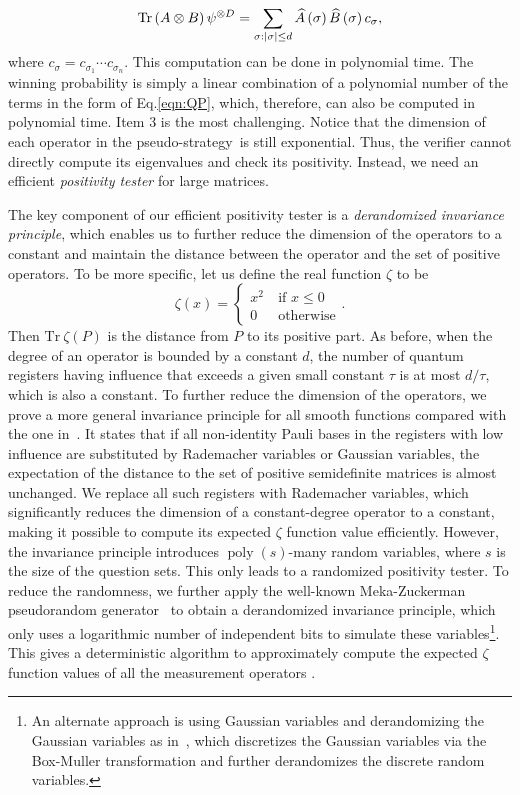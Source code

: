 \documentclass[11pt]{article}
\theoremstyle{plain}
\theoremstyle{definition}
\newcommand {\br} [1] {\ensuremath{ \left( #1 \right) }}
\DeclarePairedDelimiter{\abs}{\lvert}{\rvert}
\newcommand {\Tr} {\ensuremath{ \mathrm{Tr} }}
\newcommand{\poly} {\ensuremath{\operatorname{poly}}}
\newcommand{\pseudostrategy} {pseudo-strategy}
\newcommand{\1}{\mathbb{1}} %
\begin{document}
\begin{equation}\label{eqn:QP}
\Tr\br{A\otimes B}\psi^{\otimes D}=\sum_{\sigma:\abs{\sigma}\leq d}\widehat{A}\br{\sigma}\widehat{B}\br{\sigma}c_{\sigma},
\end{equation}
where $c_{\sigma}=c_{\sigma_1}\cdots c_{\sigma_n}$. This computation can be done in polynomial time. The winning probability is simply a linear combination of a polynomial number of the terms in the form of Eq.\eqref{eqn:QP}, which, therefore, can also be computed in polynomial time. Item 3 is the most challenging. Notice that the dimension of each operator in the \pseudostrategy~is still exponential. Thus, the verifier cannot directly compute its eigenvalues and check its positivity. 
Instead, we need an efficient {\em positivity tester} for large matrices.

The key component of our efficient positivity tester is a {\em derandomized invariance principle}, which enables us to further reduce the dimension of the operators to a constant and maintain the distance between the operator and the set of positive operators.
To be more specific, let us define the real function $\zeta$ to be 
\begin{equation}\label{eqn:introzeta}
	\zeta\br{x}=\begin{cases}x^2~&\mbox{if $x\leq 0$}\\ 0~&\mbox{otherwise}\end{cases}.
\end{equation}
Then $\Tr~\zeta(P)$ is the distance from $P$ to its positive part.
As before, when the degree of an operator is bounded by a constant $d$, the number of quantum registers having influence that exceeds a given small constant $\tau$ is at most $d/\tau$, which is also a constant.
To further reduce the dimension of the operators,
we prove a more general invariance principle for all smooth functions compared with the one in~\cite{qin2021nonlocal}. 
It states that if all non-identity Pauli bases in the registers with low influence are substituted by Rademacher variables or Gaussian variables, the expectation of the distance to the set of positive semidefinite matrices is almost unchanged. 
We replace all such registers with Rademacher variables, which significantly reduces the dimension of a constant-degree operator to a constant, making it possible to compute its expected $\zeta$ function value efficiently. 
However, the invariance principle introduces $\poly\br{s}$-many random variables, where $s$ is the size of the question sets. 
This only leads to a randomized positivity tester. 
To reduce the randomness, we further apply the well-known Meka-Zuckerman pseudorandom generator~\cite{10.1145/1806689.1806749} to obtain a derandomized invariance principle, which only uses a logarithmic number of independent bits to simulate these variables\footnote{An alternate approach is using Gaussian variables and derandomizing the Gaussian variables as in~\cite{kane:LIPIcs.CCC.2015.567}, which discretizes the Gaussian variables via the Box-Muller transformation and further derandomizes the discrete random variables.}. This gives a deterministic algorithm to approximately compute the expected $\zeta$ function values of all the measurement operators .
\end{document}

